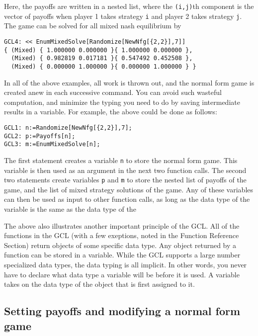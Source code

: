 \noindent
Here, the payoffs are written in a nested list, where the
\verb+(i,j)+th component is the vector of payoffs when player 1 takes
strategy \verb+i+ and player 2 takes strategy \verb+j+.  The game can
be solved for all mixed nash equilibrium by

\begin{verbatim}
GCL4: << EnumMixedSolve[Randomize[NewNfg[{2,2}],7]]
{ (Mixed) { 1.000000 0.000000 }{ 1.000000 0.000000 },
  (Mixed) { 0.982819 0.017181 }{ 0.547492 0.452508 },
  (Mixed) { 0.000000 1.000000 }{ 0.000000 1.000000 } }
\end{verbatim}

In all of the above examples, all work is thrown out, and the normal
form game is created anew in each successive command.  You can avoid
such wasteful computation, and minimize the typing you need to do by
saving intermediate results in a variable.  For example, the above
could be done as follows:

\begin{verbatim}
GCL1: n:=Randomize[NewNfg[{2,2}],7];
GCL2: p:=Payoffs[n];
GCL3: m:=EnumMixedSolve[n];
\end{verbatim}

The first statement creates a variable \verb+n+ to store the normal
form game.  This variable is then used as an argument in the next two
function calls.  The second two statements create variables \verb+p+
and \verb+m+ to store the nested list of payoffs of the game, and the
list of mixed strategy solutions of the game.  Any of these variables
can then be used as input to other function calls, as long as the data
type of the variable is the same as the data type of the 

The above also illustrates another important principle of the GCL.
All of the functions in the GCL (with a few exeptions, noted in the
Function Reference Section) return objects of some specific data type.
Any object returned by a function can be stored in a variable.  While
the GCL supports a large number specialized data types, the data
typing is all implicit.  In other words, you never have to declare
what data type a variable will be before it is used.  A variable takes
on the data type of the object that is first assigned to it.    

\subsection{Setting payoffs and modifying a normal form
game}  

